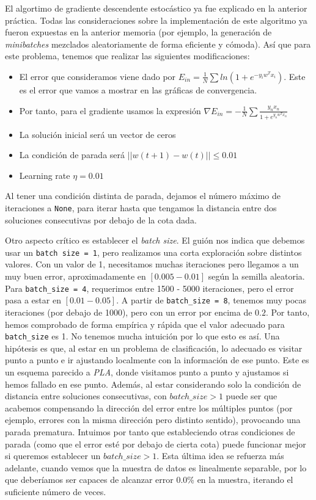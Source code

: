 \documentclass[11pt]{article}
\begin{document}
El algortimo de gradiente descendente estocástico ya fue explicado en la anterior práctica. Todas las consideraciones sobre la implementación de este algoritmo ya fueron expuestas en la anterior memoria (por ejemplo, la generación de \emph{minibatches} mezclados aleatoriamente de forma eficiente y cómoda). Así que para este problema, tenemos que realizar las siguientes modificaciones:

\begin{itemize}
    \item El error que consideramos viene dado por $E_{in} = \frac{1}{N} \sum ln(1 + e^{-y_i w^T x_i})$. Este es el error que vamos a mostrar en las gráficas de convergencia.
    \item Por tanto, para el gradiente usamos la expresión $\nabla E_{in} = -\frac{1}{N} \sum \frac{y_n x_n}{1+e^{y_n w^T x_n}}$
    \item La solución inicial será un vector de ceros
    \item La condición de parada será $||w(t+1) - w(t)|| \leq 0.01$
    \item Learning rate $\eta = 0.01$
\end{itemize}

Al tener una condición distinta de parada, dejamos el número máximo de iteraciones a \lstinline{None}, para iterar hasta que tengamos la distancia entre dos soluciones consecutivas por debajo de la cota dada.

Otro aspecto crítico es establecer el \emph{batch size}. El guión nos indica que debemos usar un \lstinline{batch size = 1}, pero realizamos una corta exploración sobre distintos valores. Con un valor de 1, necesitamos muchas iteraciones pero llegamos a un muy buen error, aproximadamente en $[0.005 - 0.01]$ según la semilla aleatoria. Para \lstinline{batch_size = 4}, requerimos entre 1500 - 5000 iteraciones, pero el error pasa a estar en $[0.01 - 0.05]$. A partir de \lstinline{batch_size = 8}, tenemos muy pocas iteraciones (por debajo de 1000), pero con un error por encima de $0.2$. Por tanto, hemos comprobado de forma empírica y rápida que el valor adecuado para \lstinline{batch_size} es 1. No tenemos mucha intuición por lo que esto es así. Una hipótesis es que, al estar en un problema de clasificación, lo adecuado es visitar punto a punto e ir ajustando localmente con la información de ese punto. Este es un esquema parecido a \emph{PLA}, donde visitamos punto a punto y ajustamos si hemos fallado en ese punto. Además, al estar considerando solo la condición de distancia entre soluciones consecutivas, con $batch\_size > 1$ puede ser que acabemos compensando la dirección del error entre los múltiples puntos (por ejemplo, errores con la misma dirección pero distinto sentido), provocando una parada prematura. Intuimos por tanto que estableciendo otras condiciones de parada (como que el error esté por debajo de cierta cota) puede funcionar mejor si queremos establecer un $batch\_size  >1$. Esta última idea se refuerza más adelante, cuando vemos que la muestra de datos es linealmente separable, por lo que deberíamos ser capaces de alcanzar error 0.0\% en la muestra, iterando el suficiente número de veces.
\end{document}
